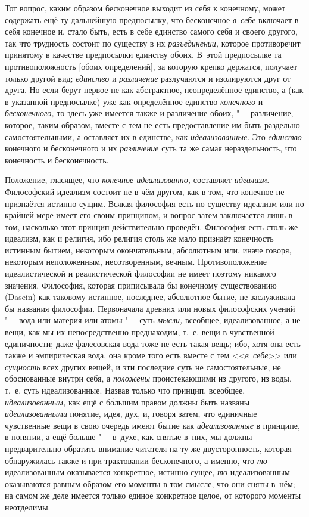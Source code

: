 Тот вопрос, каким образом бесконечное выходит из себя к конечному, может
содержать ещё ту дальнейшую предпосылку, что бесконечное
{\em в~себе} включает в себя конечное и, стало быть,
есть в себе единство самого себя и своего другого, так что трудность
состоит по существу в их {\em разъединении,} которое
противоречит принятому в качестве предпосылки единству обоих. В~этой
предпосылке та противоположность [обоих определений], за которую крепко
держатся, получает только другой вид; {\em единство} и
{\em различение} разлучаются и изолируются друг от
друга. Но если берут первое не как абстрактное, неопределённое единство, а
(как в указанной предпосылке) уже как определённое единство
{\em конечного} и {\em бесконечного,} то здесь уже имеется также и
различение обоих, "--- различение, которое, таким образом, вместе с тем не
есть предоставление им быть раздельно самостоятельными, а оставляет их в
единстве, как {\em идеализованные}. Это {\em единство} конечного и
бесконечного и их {\em различение} суть та же самая нераздельность,
что конечность и бесконечность.


Положение, гласящее, что {\em конечное идеализованно,}
составляет {\em идеализм}. Философский идеализм состоит
не в чём другом, как в том, что конечное не признаётся истинно сущим.
Всякая философия есть по существу идеализм или по крайней мере имеет его
своим принципом, и вопрос затем заключается лишь в том, насколько этот
принцип действительно проведён. Философия есть столь же идеализм, как и
религия, ибо религия столь же мало признаёт конечность истинным бытием,
некоторым окончательным, абсолютным или, иначе говоря, некоторым
неположенным, несотворенным, вечным. Противоположение идеалистической и
реалистической философии не имеет поэтому никакого значения. Философия,
которая приписывала бы конечному существованию (Dasein) как таковому
истинное, последнее, абсолютное бытие, не заслуживала бы названия
философии. Первоначала древних или новых философских учений "--- вода или
материя или атомы "--- суть {\em мысли,} всеобщее,
идеализованное, а не вещи, как мы их непосредственно преднаходим, т.~е.
вещи в чувственной единичности; даже фалесовская вода тоже не есть такая
вещь; ибо, хотя она есть также и эмпирическая вода, она кроме того есть
вместе с тем <<{\em в~себе}>> или
{\em сущность} всех других вещей, и эти последние суть
не самостоятельные, не обоснованные внутри себя, а
{\em положены} проистекающими из другого, из
воды, т.~е. суть идеализованные. Назвав только что принцип, всеобщее,
{\em идеализованным,} как ещё с б\'{о}льшим правом должны
быть названы {\em идеализованными} понятие, идея, дух,
и, говоря затем, что единичные чувственные вещи в свою очередь имеют бытие
как {\em идеализованные} в принципе, в понятии, а ещё
больше "--- в~духе, как снятые в~них, мы должны предварительно обратить
внимание читателя на ту же двусторонность, которая обнаружилась также и при
трактовании бесконечного, а именно, что {\em то}
идеализованным оказывается конкретное, истинно-сущее,
{\em то} идеализованным оказываются равным образом его
моменты в том смысле, что они сняты в~нём; на самом же деле имеется только
единое конкретное целое, от которого моменты неотделимы.

